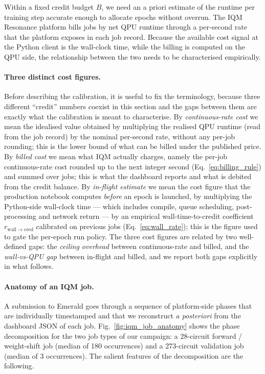 Within a fixed credit budget $B$, we need an a priori estimate of the runtime per training step accurate enough to allocate epochs without overrun. The IQM Resonance platform bills jobs by net QPU runtime through a per-second rate that the platform exposes in each job record. Because the available cost signal at the Python client is the wall-clock time, while the billing is computed on the QPU side, the relationship between the two needs to be characterised empirically.

\paragraph{Three distinct cost figures.}
Before describing the calibration, it is useful to fix the terminology, because three different ``credit'' numbers coexist in this section and the gaps between them are exactly what the calibration is meant to characterise. By \emph{continuous-rate cost} we mean the idealised value obtained by multiplying the realised QPU runtime (read from the job record) by the nominal per-second rate, without any per-job rounding; this is the lower bound of what can be billed under the published price. By \emph{billed cost} we mean what IQM actually charges, namely the per-job continuous-rate cost rounded up to the next integer second (Eq.~\ref{eq:billing_rule}) and summed over jobs; this is what the dashboard reports and what is debited from the credit balance. By \emph{in-flight estimate} we mean the cost figure that the production notebook computes \emph{before} an epoch is launched, by multiplying the Python-side wall-clock time --- which includes compile, queue scheduling, post-processing and network return --- by an empirical wall-time-to-credit coefficient $r_{\mathrm{wall}\to\mathrm{cred}}$ calibrated on previous jobs (Eq.~\ref{eq:wall_rate}); this is the figure used to gate the per-epoch run policy. The three cost figures are related by two well-defined gaps: the \emph{ceiling overhead} between continuous-rate and billed, and the \emph{wall-vs-QPU gap} between in-flight and billed, and we report both gaps explicitly in what follows.

\paragraph{Anatomy of an IQM job.}
A submission to Emerald goes through a sequence of platform-side phases that are individually timestamped and that we reconstruct \emph{a posteriori} from the dashboard JSON of each job. Fig.~\ref{fig:iqm_job_anatomy} shows the phase decomposition for the two job types of our campaign: a 28-circuit forward / weight-shift job (median of 180 occurrences) and a 273-circuit validation job (median of 3 occurrences). The salient features of the decomposition are the following.

